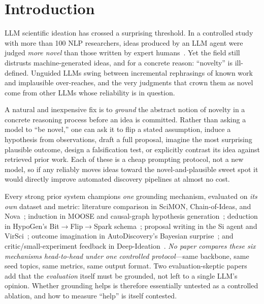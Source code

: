 \section{Introduction}
\label{sec:intro}

LLM scientific ideation has crossed a surprising threshold. In a controlled study with more than 100 NLP researchers, ideas produced by an LLM agent were judged \emph{more novel} than those written by expert humans~\citep{si2024can}. Yet the field still distrusts machine-generated ideas, and for a concrete reason: ``novelty'' is ill-defined. Unguided LLMs swing between incremental rephrasings of known work and implausible over-reaches, and the very judgments that crown them as novel come from other LLMs whose reliability is in question.

A natural and inexpensive fix is to \emph{ground} the abstract notion of novelty in a concrete reasoning process before an idea is committed. Rather than asking a model to ``be novel,'' one can ask it to flip a stated assumption, induce a hypothesis from observations, draft a full proposal, imagine the most surprising plausible outcome, design a falsification test, or explicitly contrast its idea against retrieved prior work. Each of these is a cheap prompting protocol, not a new model, so if any reliably moves ideas toward the novel-and-plausible sweet spot it would directly improve automated discovery pipelines at almost no cost.

 Every strong prior system champions \emph{one} grounding mechanism, evaluated on \emph{its own} dataset and metric: literature comparison in SciMON, Chain-of-Ideas, and Nova~\citep{wang2023scimon,li2024chain,nova2024}; induction in MOOSE and causal-graph hypothesis generation~\citep{yang2023moose,causalgraph2024}; deduction in HypoGen's Bit$\rightarrow$Flip$\rightarrow$Spark schema~\citep{hypogen2025}; proposal writing in the Si agent and VirSci~\citep{si2024can,virsci2024}; outcome imagination in AutoDiscovery's Bayesian surprise~\citep{autodiscovery2025}; and critic/small-experiment feedback in Deep-Ideation~\citep{deepideation2025}. \emph{No paper compares these six mechanisms head-to-head under one controlled protocol}---same backbone, same seed topics, same metrics, same output format. Two evaluation-skeptic papers~\citep{glitters2025,rqbench2026} add that the \emph{evaluation} itself must be grounded, not left to a single LLM's opinion. Whether grounding helps is therefore essentially untested as a controlled ablation, and how to measure ``help'' is itself contested.

